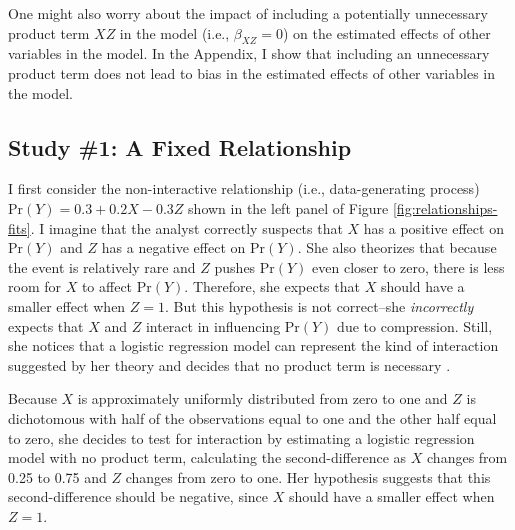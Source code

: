 \documentclass[12pt]{article}
\begin{document}
One might also worry about the impact of including a potentially unnecessary product term $XZ$ in the model (i.e., $\beta_{XZ} = 0$) on the estimated effects of other variables in the model. In the Appendix, I show that including an unnecessary product term does not lead to bias in the estimated effects of other variables in the model.

\subsection*{Study \#1: A Fixed Relationship} 

I first consider the non-interactive relationship (i.e., data-generating process) $\text{Pr}(Y) = 0.3 + 0.2X - 0.3Z$ shown in the left panel of Figure \ref{fig:relationships-fits}. I imagine that the analyst correctly suspects that $X$ has a positive effect on $\text{Pr}(Y)$ and $Z$ has a negative effect on $\text{Pr}(Y)$.  She also theorizes that because the event is relatively rare and $Z$ pushes $\text{Pr}(Y)$ even closer to zero,  there is less room for $X$ to affect $\text{Pr}(Y)$. Therefore, she expects that $X$ should have a smaller effect when $Z=1$. But this hypothesis is not correct--she \textit{incorrectly} expects that $X$ and $Z$ interact in influencing $\text{Pr}(Y)$ due to compression. Still, she notices that a logistic regression model can represent the kind of interaction suggested by her theory and decides that no product term is necessary \citep{BerryDeMerittEsarey2010}. 

Because $X$ is approximately uniformly distributed from zero to one and $Z$ is dichotomous with half of the observations equal to one and the other half equal to zero, she decides to test for interaction by estimating a logistic regression model with no product term, calculating the second-difference as $X$ changes from 0.25 to 0.75 and $Z$ changes from zero to one. Her hypothesis suggests that this second-difference should be negative, since $X$ should have a smaller effect when $Z=1$.
\end{document}
